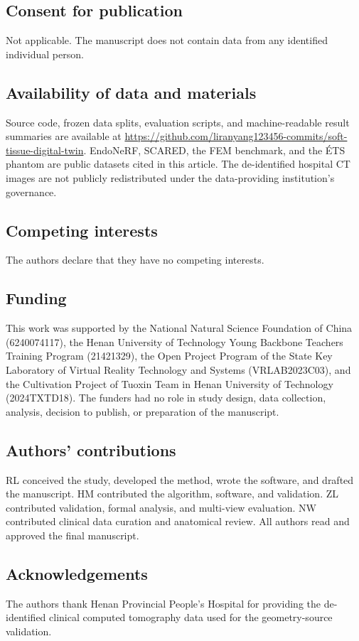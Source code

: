 \documentclass[smallextended]{svjour3}
\begin{document}
\subsection*{Consent for publication}
Not applicable. The manuscript does not contain data from any identified individual person.

\subsection*{Availability of data and materials}
Source code, frozen data splits, evaluation scripts, and machine-readable
result summaries are available at
\url{https://github.com/liranyang123456-commits/soft-tissue-digital-twin}.
EndoNeRF, SCARED, the FEM benchmark, and the \'ETS phantom are public
datasets cited in this article. The de-identified hospital CT images are
not publicly redistributed under the data-providing institution's
governance.

\subsection*{Competing interests}
The authors declare that they have no competing interests.

\subsection*{Funding}
This work was supported by the National Natural Science Foundation of China (6240074117), the Henan University of Technology Young Backbone Teachers Training Program (21421329), the Open Project Program of the State Key Laboratory of Virtual Reality Technology and Systems (VRLAB2023C03), and the Cultivation Project of Tuoxin Team in Henan University of Technology (2024TXTD18). The funders had no role in study design, data collection, analysis, decision to publish, or preparation of the manuscript.

\subsection*{Authors' contributions}
RL conceived the study, developed the method, wrote the software, and drafted the manuscript. HM contributed the algorithm, software, and validation. ZL contributed validation, formal analysis, and multi-view evaluation. NW contributed clinical data curation and anatomical review. All authors read and approved the final manuscript.

\subsection*{Acknowledgements}
The authors thank Henan Provincial People's Hospital for providing the de-identified clinical computed tomography data used for the geometry-source validation.



\end{document}
